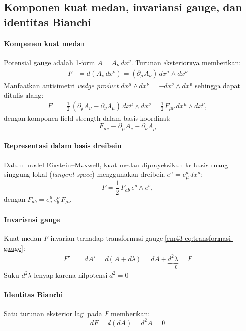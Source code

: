 \subsection{Komponen kuat medan, invariansi gauge, dan identitas Bianchi}

\paragraph{Komponen kuat medan}
Potensial gauge adalah 1-form $A = A_\nu\, d x^\nu$. Turunan
eksteriornya memberikan:
\begin{align}
  F &= d(A_\nu\, d x^\nu)
  = (\partial_\mu A_\nu)\, d x^\mu \wedge d x^\nu
\end{align}
Manfaatkan antisimetri \textit{wedge product}
$d x^\mu \wedge d x^\nu = -d x^\nu \wedge d x^\mu$
sehingga dapat ditulis ulang:
\begin{align}
  F &= \frac{1}{2}\,(\partial_\mu A_\nu - \partial_\nu A_\mu)\,
    d x^\mu \wedge d x^\nu
  = \frac{1}{2}\, F_{\mu\nu}\, d x^\mu \wedge d x^\nu,
\end{align}
dengan komponen field strength dalam basis koordinat:
\begin{equation}\label{em43-eq:Fmunu-def}
  F_{\mu\nu} \equiv \partial_\mu A_\nu - \partial_\nu A_\mu
\end{equation}

\paragraph{Representasi dalam basis dreibein}
Dalam model Einstein--Maxwell, kuat medan diproyeksikan ke basis
ruang singgung lokal (\emph{tangent space}) menggunakan dreibein
$e^{a} = e^{a}_{\mu}\, d x^{\mu}$:
\begin{equation}
  F = \frac{1}{2}\, F_{ab}\, e^{a} \wedge e^{b},
\end{equation}
dengan $F_{ab} = e^{\mu}_{a}\, e^{\nu}_{b}\, F_{\mu\nu}$

\paragraph{Invariansi gauge}
Kuat medan $F$ invarian terhadap transformasi gauge
\eqref{em43-eq:transformasi-gauge}:
\begin{align}
  F' &= d A'
  = d(A + d\lambda)
  = d A + \underbrace{d^{2}\lambda}_{= 0}
  = F
\end{align}
Suku $d^{2}\lambda$ lenyap karena nilpotensi $d^{2} = 0$

\paragraph{Identitas Bianchi}
Satu turunan eksterior lagi pada $F$ memberikan:
\begin{equation}
  d F = d(d A) = d^{2} A = 0
\end{equation}